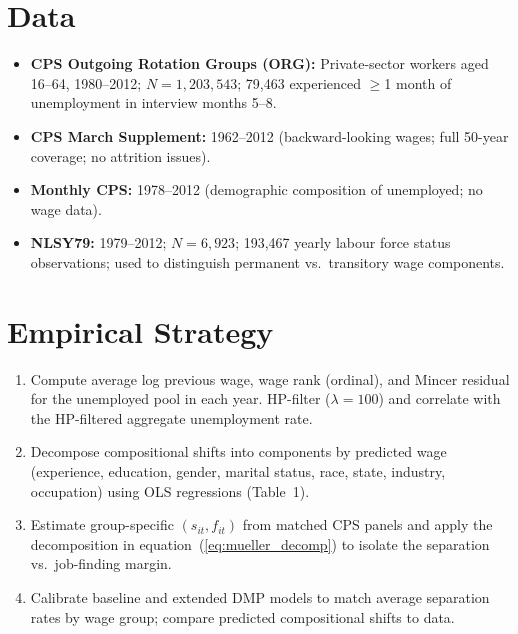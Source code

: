 \section{Data}

\begin{itemize}
  \item \textbf{CPS Outgoing Rotation Groups (ORG):} Private-sector workers
    aged 16--64, 1980--2012; $N=1{,}203{,}543$; 79,463 experienced $\geq$1
    month of unemployment in interview months 5--8.
  \item \textbf{CPS March Supplement:} 1962--2012 (backward-looking wages;
    full 50-year coverage; no attrition issues).
  \item \textbf{Monthly CPS:} 1978--2012 (demographic composition of
    unemployed; no wage data).
  \item \textbf{NLSY79:} 1979--2012; $N=6{,}923$; 193,467 yearly labour
    force status observations; used to distinguish permanent vs.\ transitory
    wage components.
\end{itemize}

\section{Empirical Strategy}

\begin{enumerate}
  \item Compute average log previous wage, wage rank (ordinal), and Mincer
    residual for the unemployed pool in each year. HP-filter ($\lambda=100$)
    and correlate with the HP-filtered aggregate unemployment rate.
  \item Decompose compositional shifts into components by predicted wage
    (experience, education, gender, marital status, race, state, industry,
    occupation) using OLS regressions (Table~1).
  \item Estimate group-specific $(s_{it}, f_{it})$ from matched CPS panels
    and apply the decomposition in equation~(\ref{eq:mueller_decomp}) to
    isolate the separation vs.\ job-finding margin.
  \item Calibrate baseline and extended DMP models to match average separation
    rates by wage group; compare predicted compositional shifts to data.
\end{enumerate}

